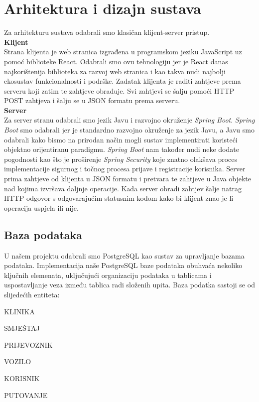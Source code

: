\chapter{Arhitektura i dizajn sustava}
		
	Za arhitekturu sustava odabrali smo klasičan klijent-server pristup. \\
	
	\textbf{Klijent}\\
	Strana klijenta je web stranica izgrađena u programskom jeziku JavaScript uz pomoć biblioteke React. Odabrali smo ovu tehnologiju jer je React danas najkorištenija biblioteka za razvoj web stranica i kao takva nudi najbolji ekosustav funkcionalnosti i podrške. Zadatak klijenta je raditi zahtjeve prema serveru koji zatim te zahtjeve obrađuje. Svi zahtjevi se šalju pomoći HTTP POST zahtjeva i šalju se u JSON formatu prema serveru.\\
	
	\textbf{Server}\\
	Za server stranu odabrali smo jezik Javu i razvojno okruženje \textit{Spring Boot}. \textit{Spring Boot} smo odabrali jer je standardno razvojno okruženje za jezik Javu, a Javu smo odabrali kako bismo na prirodan način mogli sustav implementirati koristeći objektno orijentiranu paradigmu. \textit{Spring Boot} nam također nudi neke dodate pogodnosti kao što je proširenje \textit{Spring Security} koje znatno olakšava proces implementacije sigurnog i točnog procesa prijave i registracije korisnika. Server prima zahtjeve od klijenta u JSON formatu i pretvara te zahtjeve u Java objekte nad kojima izvršava daljnje operacije. Kada server obradi zahtjev šalje natrag HTTP odgovor s odgovarajućim statusnim kodom kako bi klijent znao je li operacija uspjela ili nije.
		

		

				
		\section{Baza podataka}
			
		U našem projektu odabrali smo PostgreSQL kao sustav za upravljanje bazama podataka. Implementacija naše PostgreSQL baze podataka obuhvaća nekoliko ključnih elemenata, uključujući organizaciju podataka u tablicama i uspostavljanje veza između tablica radi složenih upita. Baza podatka sastoji se od slijedećih entiteta: 
		
		\begin{packed_item}
			\item KLINIKA
			\item SMJEŠTAJ
			\item PRIJEVOZNIK
			\item VOZILO
			\item KORISNIK
			\item PUTOVANJE
		\end{packed_item}
		
